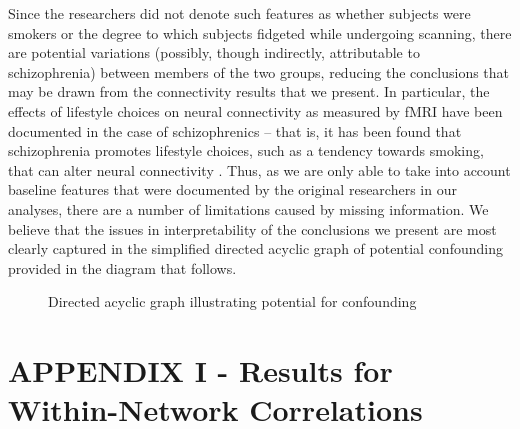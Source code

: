 \documentclass[11pt]{article}
\begin{document}
Since the researchers did not denote such features as whether subjects were smokers or the
degree to which subjects fidgeted while undergoing scanning, there are potential
variations (possibly, though indirectly, attributable to schizophrenia) between
members of the two groups, reducing the conclusions that may be drawn from the
connectivity results that we present. In particular, the effects of lifestyle
choices on neural connectivity as measured by fMRI have been documented in the
case of schizophrenics -- that is, it has been found that schizophrenia promotes
lifestyle choices, such as a tendency towards smoking, that can alter neural
connectivity \cite{leyba2008smoking}. Thus, as we are only able to take into 
account baseline features that were documented by the original researchers in 
our analyses, there are a number of limitations caused by missing information. 
We believe that the issues in interpretability of the conclusions we present 
are most clearly captured in the simplified directed acyclic graph of potential 
confounding provided in the diagram that follows. \\[10pt]

\begin{figure}[H]
\centering
{}
\caption{Directed acyclic graph illustrating potential for confounding}
\end{figure}



\newpage
\appendix

\section{APPENDIX I - Results for Within-Network Correlations}
\end{document}
